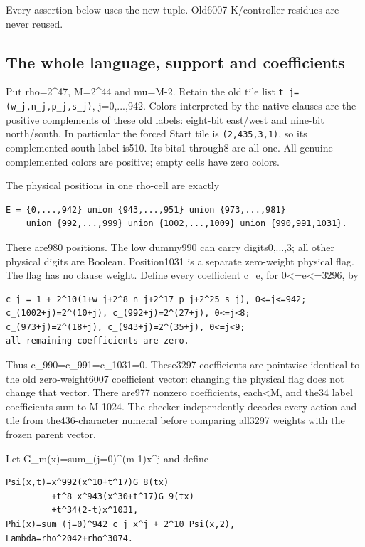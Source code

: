 Every assertion below uses the new tuple. Old6007 K/controller residues are never reused.

\subsection{The whole language, support and coefficients}
Put rho=2\textasciicircum{}47, M=2\textasciicircum{}44 and mu=M-2. Retain the old tile list \texttt{t\_j=(w\_j,n\_j,p\_j,s\_j)}, j=0,...,942. Colors interpreted by the native clauses are the positive complements of these old labels: eight-bit east/west and nine-bit north/south. In particular the forced Start tile is \texttt{(2,435,3,1)}, so its complemented south label is510. Its bits1 through8 are all one. All genuine complemented colors are positive; empty cells have zero colors.

The physical positions in one rho-cell are exactly

\begin{Verbatim}[fontsize=\small,breaklines=true,breakanywhere=true,breaksymbolleft={}]
E = {0,...,942} union {943,...,951} union {973,...,981}
    union {992,...,999} union {1002,...,1009} union {990,991,1031}.
\end{Verbatim}

There are980 positions. The low dummy990 can carry digits0,...,3; all other physical digits are Boolean. Position1031 is a separate zero-weight physical flag. The flag has no clause weight. Define every coefficient c\_e, for 0<=e<=3296, by

\begin{Verbatim}[fontsize=\small,breaklines=true,breakanywhere=true,breaksymbolleft={}]
c_j = 1 + 2^10(1+w_j+2^8 n_j+2^17 p_j+2^25 s_j), 0<=j<=942;
c_(1002+j)=2^(10+j), c_(992+j)=2^(27+j), 0<=j<8;
c_(973+j)=2^(18+j), c_(943+j)=2^(35+j), 0<=j<9;
all remaining coefficients are zero.
\end{Verbatim}

Thus c\_990=c\_991=c\_1031=0. These3297 coefficients are pointwise identical to the old zero-weight6007 coefficient vector: changing the physical flag does not change that vector. There are977 nonzero coefficients, each<M, and the34 label coefficients sum to M-1024. The checker independently decodes every action and tile from the436-character numeral before comparing all3297 weights with the frozen parent vector.

Let G\_m(x)=sum\_(j=0)\textasciicircum{}(m-1)x\textasciicircum{}j and define

\begin{Verbatim}[fontsize=\small,breaklines=true,breakanywhere=true,breaksymbolleft={}]
Psi(x,t)=x^992(x^10+t^17)G_8(tx)
         +t^8 x^943(x^30+t^17)G_9(tx)
         +t^34(2-t)x^1031,
Phi(x)=sum_(j=0)^942 c_j x^j + 2^10 Psi(x,2),
Lambda=rho^2042+rho^3074.
\end{Verbatim}

